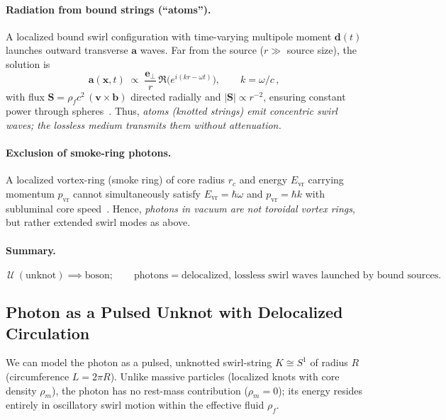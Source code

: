 \documentclass[11pt]{article}
\newcommand{\rhof}{\rho_{\!f}}                           %
\newcommand{\rhom}{\rho_{\!m}}                           %
\newcommand{\rc}{r_c}                                    %
\begin{document}
\paragraph{Radiation from bound strings (``atoms'').}
    A localized bound swirl configuration with time-varying multipole moment $\mathbf{d}(t)$ launches outward transverse $\mathbf{a}$ waves. Far from the source ($r \gg$ source size), the solution is
    \[
        \mathbf{a}(\mathbf{x},t) \;\propto\; \frac{\mathbf{e}_\perp}{r}\,\Re\!\big(e^{i(kr-\omega t)}\big), \qquad k=\omega/c\,,
    \]
    with flux $\mathbf{S}=\rhof c^2\,(\mathbf{v}\times\mathbf{b})$ directed radially and $|\mathbf{S}|\propto r^{-2}$, ensuring constant power through spheres~\cite{Jackson1999}. Thus, \emph{atoms (knotted strings) emit concentric swirl waves; the lossless medium transmits them without attenuation.}

\paragraph{Exclusion of smoke-ring photons.}
    A localized vortex-ring (smoke ring) of core radius $\rc$ and energy $E_{\text{vr}}$ carrying momentum $p_{\text{vr}}$ cannot simultaneously satisfy $E_{\text{vr}}=\hbar\omega$ and $p_{\text{vr}}=\hbar k$ with subluminal core speed~\cite{Saffman1992,Batchelor1967}. Hence, \emph{photons in vacuum are not toroidal vortex rings}, but rather extended swirl modes as above.

\paragraph{Summary.}
    \[
        \boxed{\,\mathcal{U} \ (\text{unknot}) \implies \text{boson}; \qquad
        \text{photons} = \text{delocalized, lossless swirl waves launched by bound sources.}\,}
    \]

\subsection{Photon as a Pulsed Unknot with Delocalized Circulation}
\label{sec:photon_pulsed_unknot}
We can model the photon as a pulsed, unknotted swirl-string $K \cong S^1$ of radius $R$ (circumference $L=2\pi R$). Unlike massive particles (localized knots with core density $\rhom$), the photon has no rest-mass contribution ($\rhom=0$); its energy resides entirely in oscillatory swirl motion within the effective fluid $\rhof$.
\end{document}
